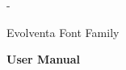\begin{titlingpage}
\calccentering{\unitlength}
\begin{adjustwidth*}{\unitlength}{-\unitlength}
	\vspace*{\fill}
	\begin{center}
	\DoubleSpacing
	\huge Evolventa Font Family\par
	\vspace{\onelineskip}
	\LARGE \textbf{User Manual}\par
	\end{center}
	\vspace*{\fill}
\end{adjustwidth*}
\end{titlingpage}
